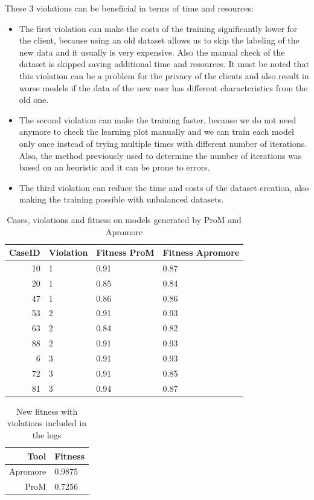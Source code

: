 These 3 violations can be beneficial in terms of time and resources:
\begin{itemize}
    \item The first violation can make the costs of the training significantly
    lower for the client, because using an old dataset allows us to skip 
    the labeling of the new data and it usually is very expensive. 
    Also the manual check of the dataset is skipped saving additional time and
    resources. It must be noted that this violation can be a problem for
    the privacy of the clients and also result in worse models if the data of
    the new user has different characteristics from the old one.
    \item The second violation can make the training faster, because we do not
    need anymore to check the learning plot manually and we can train each
    model only once instead of trying multiple times with different number of
    iterations. Also, the method previously used to determine the number of
    iterations was based on an heuristic and it can be prone to errors.
    \item The third violation can reduce the time and costs of the dataset
    creation, also making the training possible with unbalanced datasets.
\end{itemize}

\begin{table}[H]
\centering
\begin{tabular}{|r|l|l|l|}
\hline
\textbf{CaseID} & \textbf{Violation} & \textbf{Fitness ProM} & \textbf{Fitness Apromore} \\
\hline
10 & 1 & 0.91 & 0.87 \\
\hline
20 & 1 & 0.85 & 0.84 \\
\hline
47 & 1 & 0.86 & 0.86 \\
\hline
53 & 2 & 0.91 & 0.93 \\
\hline
63 & 2 & 0.84 & 0.82 \\
\hline
88 & 2 & 0.91 & 0.93 \\
\hline
6 & 3 & 0.91 & 0.93 \\
\hline
72 & 3 & 0.91 & 0.85 \\
\hline
81 & 3 & 0.94 & 0.87 \\
\hline
\end{tabular}
\caption{Cases, violations and fitness on models generated by ProM and Apromore}
\label{tab:violations}
\end{table}

\begin{table}[H]
\centering
\begin{tabular}{|r|l|}
\hline
\textbf{Tool} & \textbf{Fitness} \\
\hline
Apromore & 0.9875 \\
\hline
ProM & 0.7256 \\
\hline
\end{tabular}
\caption{New fitness with violations included in the logs}
\label{tab:violations_fitness}
\end{table}

